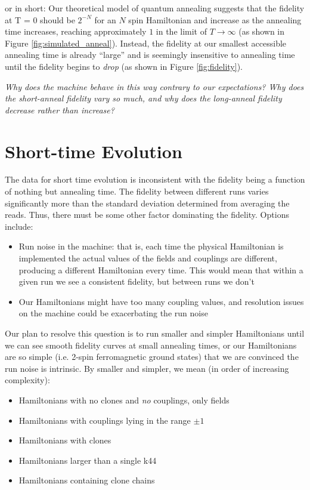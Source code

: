 or in short: Our theoretical model of quantum annealing suggests that the fidelity at T = 0 should be $2^{-N}$ for an $N$ spin Hamiltonian and increase as the annealing time increases, reaching approximately $1$ in the limit of $T \rightarrow \infty$ (as shown in Figure \ref{fig:simulated_anneal}).  Instead, the fidelity at our smallest accessible annealing time is already ``large'' and is seemingly insensitive to annealing time until the fidelity begins to \emph{drop} (as shown in Figure \ref{fig:fidelity}).

\emph{Why does the machine behave in this way contrary to our expectations?  Why does the short-anneal fidelity vary so much, and why does the long-anneal fidelity decrease rather than increase?}

\section{Short-time Evolution}
The data for short time evolution is inconsistent with the fidelity being a function of nothing but annealing time.  The fidelity between different runs varies significantly more than the standard deviation determined from averaging the reads.  Thus, there must be some other factor dominating the fidelity.  Options include:

\begin{itemize}
	\item Run noise in the machine: that is, each time the physical Hamiltonian is implemented the actual values of the fields and couplings are different, producing a different Hamiltonian every time.  This would mean that within a given run we see a consistent fidelity, but between runs we don't
	\item Our Hamiltonians might have too many coupling values, and resolution issues on the machine could be exacerbating the run noise
\end{itemize}

Our plan to resolve this question is to run smaller and simpler Hamiltonians until we can see smooth fidelity curves at small annealing times, or our Hamiltonians are so simple (i.e. 2-spin ferromagnetic ground states) that we are convinced the run noise is intrinsic.  By smaller and simpler, we mean (in order of increasing complexity):

\begin{itemize}
	\item Hamiltonians with no clones and \emph{no} couplings, only fields
	\item Hamiltonians with couplings lying in the range $\pm 1$
	\item Hamiltonians with clones
	\item Hamiltonians larger than a single k44
	\item Hamiltonians containing clone chains
\end{itemize}

